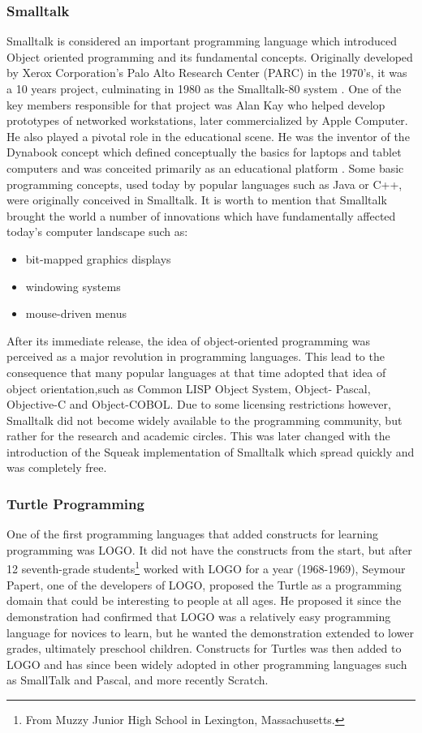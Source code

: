 \subsubsection{Smalltalk}
Smalltalk is considered an important programming language which  introduced Object oriented programming and its fundamental concepts. Originally developed by Xerox Corporation's Palo Alto Research Center (PARC) in the 1970's, it was a 10 years project, culminating in 1980 as the Smalltalk-80 system \cite{smalltalk}. One of the key members responsible for that project was Alan Kay who helped develop prototypes of networked workstations, later commercialized by Apple Computer. He also played a pivotal role in the educational scene. He was the inventor of the Dynabook concept which defined conceptually the basics for laptops and tablet computers and was conceited primarily as an educational platform \cite{dynabook}. Some basic programming concepts, used today by popular languages such as Java or C++, were originally conceived in Smalltalk. It is worth to mention that Smalltalk brought the world a number of innovations which have fundamentally affected today's computer landscape such as:
\begin{itemize}
\item bit-mapped graphics displays
\item windowing systems
\item mouse-driven menus
\end{itemize} 
After its immediate release, the idea of object-oriented programming was perceived as a major revolution in programming languages. This lead to the consequence that many popular languages at that time adopted that idea of object orientation,such as Common LISP Object System, Object- Pascal, Objective-C and Object-COBOL. Due to some licensing restrictions however, Smalltalk did not become widely available to the programming community, but rather for the research and academic circles. This was later changed with the introduction of the Squeak implementation of Smalltalk which spread quickly and was completely free. 

\subsubsection{Turtle Programming}
One of the first programming languages that added constructs for learning programming was LOGO. It did not have the constructs from the start, but after 12 seventh-grade students\footnote{From Muzzy Junior High School in Lexington, Massachusetts.} worked with LOGO for a year (1968-1969), Seymour Papert, one of the developers of LOGO, proposed the Turtle as a programming domain that could be interesting to people at all ages. He proposed it since the demonstration had confirmed that LOGO was a relatively easy programming language for novices to learn, but he wanted the demonstration extended to lower grades, ultimately preschool children. Constructs for Turtles was then added to LOGO and has since been widely adopted in other programming languages such as SmallTalk and Pascal, and more recently Scratch\cite{turtle_origin}.

